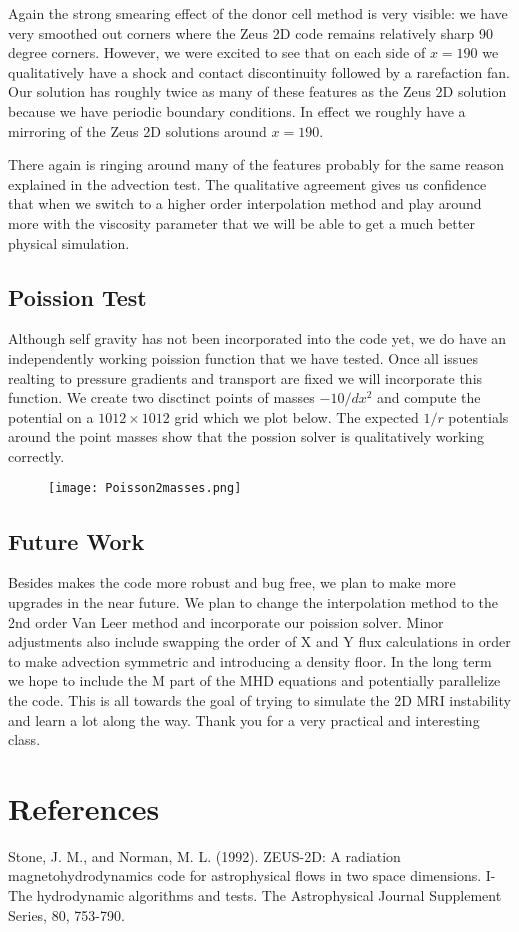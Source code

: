 \documentclass[11pt]{article}
\begin{document}
Again the strong smearing effect of the donor cell method is very visible: we have very smoothed out corners where the Zeus 2D code remains relatively sharp 90 degree corners. However, we were excited to see that on each side of $x=190$ we qualitatively have a shock and contact discontinuity followed by a rarefaction fan. Our solution has roughly twice as many of these features as the Zeus 2D solution because we have periodic boundary conditions. In effect we roughly have a mirroring of the Zeus 2D solutions around $x=190$. 

There again is ringing around many of the features probably for the same reason explained in the advection test. The qualitative agreement gives us confidence that when we switch to a higher order interpolation method and play around more with the viscosity parameter that we will be able to get a much better physical simulation.
\clearpage
\subsection{Poission Test}
Although self gravity has not been incorporated into the code yet, we do have an independently working poission function that we have tested. Once all issues realting to pressure gradients and transport are fixed we will incorporate this function. We create two disctinct points of masses $-10/dx^2$ and compute the potential on a $1012\times 1012$ grid which we plot below. The expected $1/r$ potentials around the point masses show that the possion solver is qualitatively working correctly.
\begin{figure}[h]
  \texttt{[image: Poisson2masses.png]}
\end{figure}

\subsection{Future Work}
Besides makes the code more robust and bug free, we plan to make more upgrades in the near future. We plan to change the interpolation method to the 2nd order Van Leer method and incorporate our poission solver. Minor adjustments also include swapping the order of X and Y flux calculations in order to make advection symmetric and introducing a density floor. In the long term we hope to include the M part of the MHD equations and potentially parallelize the code. This is all towards the goal of trying to simulate the 2D MRI instability and learn a lot along the way. Thank you for a very practical and interesting class.
\section{References}
Stone, J. M., and Norman, M. L. (1992). ZEUS-2D: A radiation magnetohydrodynamics code for astrophysical flows in two space dimensions. I-The hydrodynamic algorithms and tests. The Astrophysical Journal Supplement Series, 80, 753-790.
\end{document}
